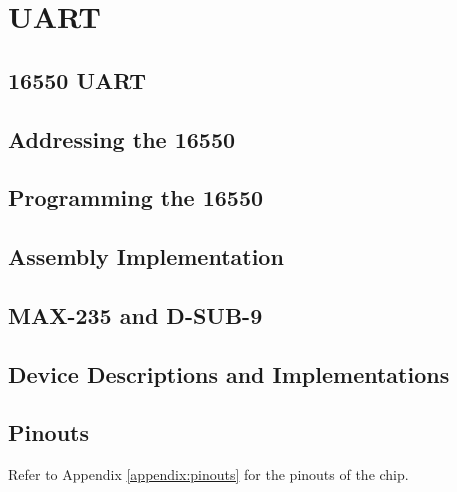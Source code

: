 \newpage
\section{UART}

    \subsection{16550 UART}

    \subsection{Addressing the 16550}

    \subsection{Programming the 16550}

    \subsection{Assembly Implementation}

    \subsection{MAX-235 and D-SUB-9}

    \subsection{Device Descriptions and Implementations}

    \subsection{Pinouts}
    Refer to Appendix \ref{appendix:pinouts} for the pinouts of the chip.

